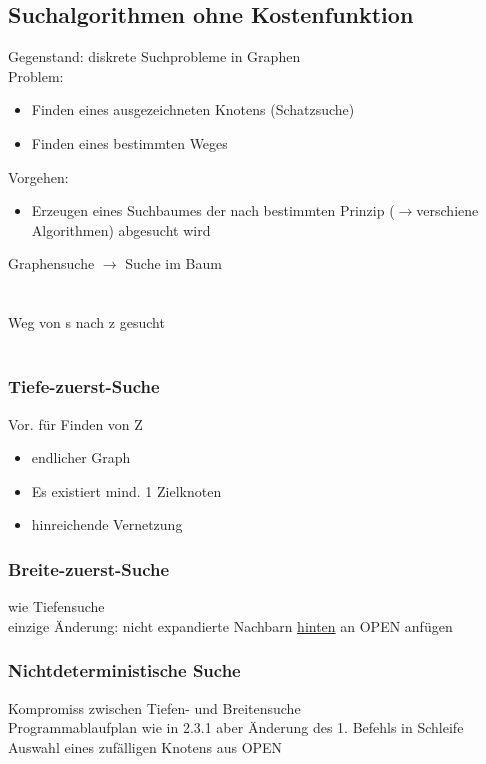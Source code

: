 \documentclass[a4paper,14pt]{article}
\begin{document}
\subsection{Suchalgorithmen ohne Kostenfunktion}
Gegenstand: diskrete Suchprobleme in Graphen\\
Problem: 
\begin{itemize}
 \item Finden eines ausgezeichneten Knotens (Schatzsuche)
 \item Finden eines bestimmten Weges
\end{itemize}

Vorgehen:
\begin{itemize}
 \item Erzeugen eines Suchbaumes der nach bestimmten Prinzip ($\rightarrow$verschiene Algorithmen) abgesucht wird
\end{itemize}

Graphensuche $\rightarrow$ Suche im Baum\\
\\
\\
Weg von s nach z gesucht\\
\\

\subsubsection{Tiefe-zuerst-Suche}

Vor. für Finden von Z
\begin{itemize}
 \item endlicher Graph
 \item Es existiert mind. 1 Zielknoten
 \item hinreichende Vernetzung
\end{itemize}

\subsubsection{Breite-zuerst-Suche}
wie Tiefensuche\\
einzige Änderung: nicht expandierte Nachbarn \underline{hinten} an OPEN anfügen\\

\subsubsection{Nichtdeterministische Suche}
Kompromiss zwischen Tiefen- und Breitensuche\\
Programmablaufplan wie in 2.3.1 aber Änderung des 1. Befehls in Schleife\\
Auswahl eines zufälligen Knotens aus OPEN
\end{document}

